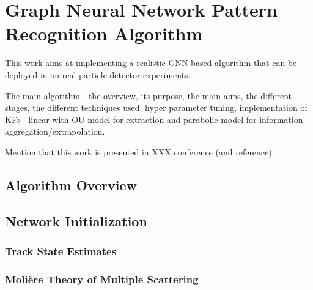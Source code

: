 
\chapter{Graph Neural Network Pattern Recognition Algorithm}\label{chapter-5}


This work aims at implementing a realistic GNN-based algorithm that can be deployed in an real particle detector experiments.

The main algorithm - the overview, its purpose, the main aims, the different stages, the different techniques used, hyper parameter tuning, implementation of KFs - linear with OU model for extraction and parabolic model for information aggregation/extrapolation.

Mention that this work is presented in XXX conference (and reference).

\section{Algorithm Overview}

\section{Network Initialization}
\subsection{Track State Estimates}
\subsection{Molière Theory of Multiple Scattering}




